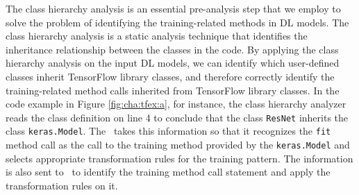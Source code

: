 The class hierarchy analysis is an essential pre-analysis step that we employ
to solve the problem of identifying the training-related methods in DL models.
The class hierarchy analysis is a static analysis technique that identifies the
inheritance relationship between the classes in the code. 
By applying the class hierarchy analysis on the input DL models, we can
identify which user-defined classes inherit TensorFlow library classes, and
therefore correctly identify the training-related method calls inherited from
TensorFlow library classes.
In the code example in Figure \ref{fig:cha:tfex:a}, for instance, the class
hierarchy analyzer reads the class definition on line 4 to conclude that the
class {\tt ResNet} inherits the class {\tt keras.Model}. 
The \tapi~takes this information so that it recognizes the {\tt fit} method
call as the call to the training method provided by the {\tt keras.Model} and
selects appropriate transformation rules for the training pattern.
The information is also sent to \atran~to identify the training method call
statement and apply the transformation rules on it.


